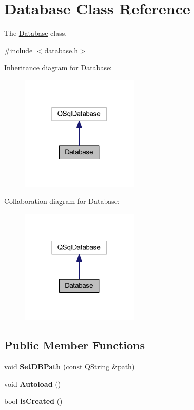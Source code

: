 \hypertarget{class_database}{}\section{Database Class Reference}
\label{class_database}


The \mbox{\hyperlink{class_database}{Database}} class.  




{\ttfamily \#include $<$database.\+h$>$}



Inheritance diagram for Database\+:
\nopagebreak
\begin{figure}[H]
\begin{center}
\leavevmode
\includegraphics[width=160pt]{class_database__inherit__graph}
\end{center}
\end{figure}


Collaboration diagram for Database\+:
\nopagebreak
\begin{figure}[H]
\begin{center}
\leavevmode
\includegraphics[width=160pt]{class_database__coll__graph}
\end{center}
\end{figure}
\subsection*{Public Member Functions}
\begin{DoxyCompactItemize}
\item 
\mbox{\label{class_database_ad66f4bc573f50c74ad00a856c9fc8de0}} 
void {\bfseries Set\+D\+B\+Path} (const Q\+String \&path)
\item 
\mbox{\label{class_database_ac03843eb8cfe802cf2cabdf8a4448ca5}} 
void {\bfseries Autoload} ()
\item 
\mbox{\label{class_database_a7f2784e4eb4771dc52d3bf19c768aefa}} 
bool {\bfseries is\+Created} ()
\end{DoxyCompactItemize}
